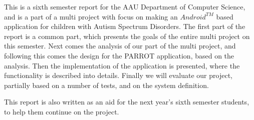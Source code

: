 This is a sixth semester report for the AAU Department of Computer Science, and is a part of a multi project with focus on making an $Android^{TM}$ based application for children with Autism Spectrum Disorders. The first part of the report is a common part, which presents the goals of the entire multi project on this semester. Next comes the analysis of our part of the multi project, and following this comes the design for the  PARROT application, based on the analysis.
Then the implementation of the application is presented, where the functionality is described into details. 
Finally we will evaluate our project, partially based on a number of tests, and on the system definition.

This report is also written as an aid for the next year's sixth semester students, to help them continue on the project.   




